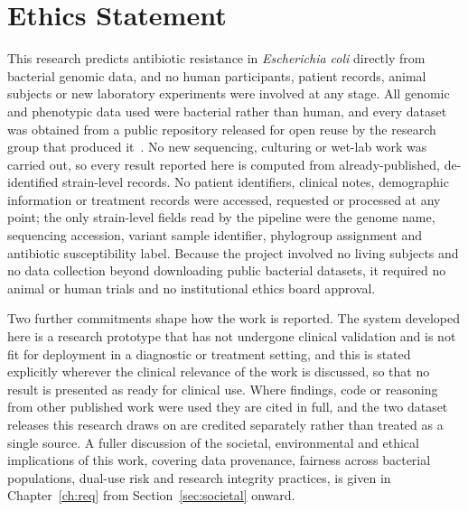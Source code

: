 \section*{Ethics Statement}

This research predicts antibiotic resistance in \textit{Escherichia coli} directly from bacterial
genomic data, and no human participants, patient records, animal subjects or new laboratory
experiments were involved at any stage. All genomic and phenotypic data used were bacterial
rather than human, and every dataset was obtained from a public repository released for open
reuse by the research group that produced it~\cite{morin2024ecoli, york2025amr, Ren2022}. No new
sequencing, culturing or wet-lab work was carried out, so every result reported here is computed
from already-published, de-identified strain-level records. No patient identifiers, clinical
notes, demographic information or treatment records were accessed, requested or processed at any
point; the only strain-level fields read by the pipeline were the genome name, sequencing
accession, variant sample identifier, phylogroup assignment and antibiotic susceptibility label.
Because the project involved no living subjects and no data collection beyond downloading public
bacterial datasets, it required no animal or human trials and no institutional ethics board
approval.

Two further commitments shape how the work is reported. The system developed here is a research
prototype that has not undergone clinical validation and is not fit for deployment in a
diagnostic or treatment setting, and this is stated explicitly wherever the clinical relevance
of the work is discussed, so that no result is presented as ready for clinical use. Where
findings, code or reasoning from other published work were used they are cited in full, and the
two dataset releases this research draws on are credited separately rather than treated as a
single source. A fuller discussion of the societal, environmental and ethical implications of
this work, covering data provenance, fairness across bacterial populations, dual-use risk and
research integrity practices, is given in Chapter~\ref{ch:req} from
Section~\ref{sec:societal} onward.

\pagebreak
